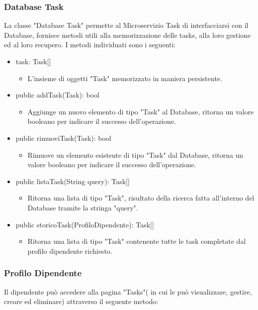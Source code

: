 \documentclass{report}
\begin{document}
\subsubsection*{Database Task}
La classe "Database Task" permette al Microservizio Task di interfacciarsi con il Database, fornisce metodi utili alla memorizzazione delle tasks, alla loro gestione ed al loro recupero. I metodi individuati sono i seguenti:
\begin{itemize}
\item task: Task[]
\begin{itemize}
	\item L'insieme di oggetti "Task" memorizzato in maniera persistente.
\end{itemize}
\item public addTask(Task): bool
\begin{itemize}
    \item Aggiunge un nuovo elemento di tipo "Task" al Database, ritorna un valore booleano per indicare il successo dell'operazione.
\end{itemize}
\item public rimuoviTask(Task): bool
\begin{itemize}
    \item Rimuove un elemento esistente di tipo "Task" dal Database, ritorna un valore booleano per indicare il successo dell'operazione.
\end{itemize}
\item public listaTask(String query): Task[]
\begin{itemize}
    \item Ritorna una lista di tipo "Task", risultato della ricerca fatta all'interno del Database tramite la stringa "query".
\end{itemize}
\item public storicoTask(ProfiloDipendente): Task[]
\begin{itemize}
    \item Ritorna una lista di tipo "Task" contenente tutte le task completate dal profilo dipendente richiesto.
\end{itemize}
\end{itemize}

\subsubsection*{Profilo Dipendente}
Il dipendente può accedere alla pagina "Tasks"( in cui le può visualizzare, gestire, creare ed eliminare) attraverso il seguente metodo:
\end{document}
